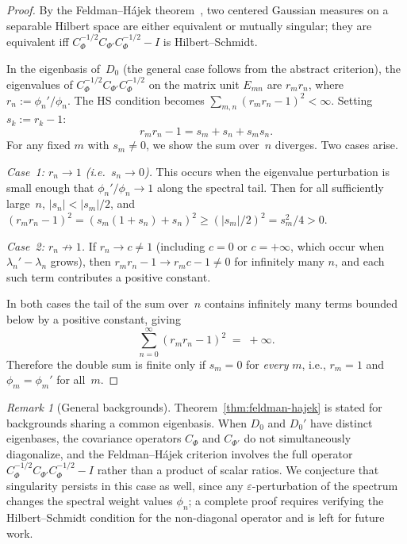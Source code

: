 \documentclass[12pt,a4paper]{article}
\theoremstyle{plain}
\theoremstyle{definition}
\theoremstyle{remark}
\newtheorem{remark}[theorem]{Remark}
\begin{document}
\begin{proof}
By the Feldman--H\'ajek
theorem~\cite{Feldman:1958,Hajek:1958,Bogachev:1998}, two centered
Gaussian measures on a separable Hilbert space are either equivalent or
mutually singular; they are equivalent iff
$C_\Phi^{-1/2} C_{\Phi'} C_\Phi^{-1/2} - I$ is Hilbert--Schmidt.

In the eigenbasis of~$D_0$
(the general case follows from the abstract criterion),
the eigenvalues of
$C_\Phi^{-1/2} C_{\Phi'} C_\Phi^{-1/2}$ on the matrix unit $E_{mn}$
are $r_m r_n$, where $r_n := \phi_n'/\phi_n$.  The HS condition
becomes $\sum_{m,n}(r_m r_n - 1)^2 < \infty$.  Setting
$s_k := r_k - 1$:
\[
  r_m r_n - 1 = s_m + s_n + s_m s_n.
\]
For any fixed $m$ with $s_m \ne 0$, we show the sum over~$n$
diverges.  Two cases arise.

\emph{Case~1: $r_n \to 1$ (i.e.\ $s_n \to 0$).}  This occurs when
the eigenvalue perturbation is small enough that $\phi_n'/\phi_n \to 1$
along the spectral tail.  Then for all sufficiently large~$n$,
$|s_n| < |s_m|/2$, and $(r_m r_n - 1)^2 = (s_m(1+s_n)+s_n)^2
\ge (|s_m|/2)^2 = s_m^2/4 > 0$.

\emph{Case~2: $r_n \not\to 1$.}  If $r_n \to c \ne 1$ (including
$c = 0$ or $c = +\infty$, which occur when $\lambda_n' - \lambda_n$
grows), then $r_m r_n - 1 \to r_m c - 1 \ne 0$ for infinitely many
$n$, and each such term contributes a positive constant.

In both cases the tail of the sum over~$n$ contains infinitely many
terms bounded below by a positive constant, giving
\[
  \sum_{n=0}^\infty (r_m r_n - 1)^2 \;=\; +\infty.
\]
Therefore the double sum is finite only if $s_m = 0$ for \emph{every}
$m$, i.e., $r_m = 1$ and $\phi_m = \phi_m'$ for all~$m$.
\end{proof}

\begin{remark}[General backgrounds]
\label{rem:fh-general}
Theorem~\ref{thm:feldman-hajek} is stated for backgrounds sharing a
common eigenbasis.  When $D_0$ and $D_0'$ have distinct eigenbases,
the covariance operators $C_\Phi$ and $C_{\Phi'}$ do not
simultaneously diagonalize, and the Feldman--H\'ajek criterion
involves the full operator
$C_\Phi^{-1/2}C_{\Phi'}C_\Phi^{-1/2} - I$ rather than a product
of scalar ratios.  We conjecture that singularity persists in this
case as well, since any $\varepsilon$-perturbation of the spectrum
changes the spectral weight values $\phi_n$; a complete proof
requires verifying the Hilbert--Schmidt condition for the
non-diagonal operator and is left for future work.
\end{remark}
\end{document}
